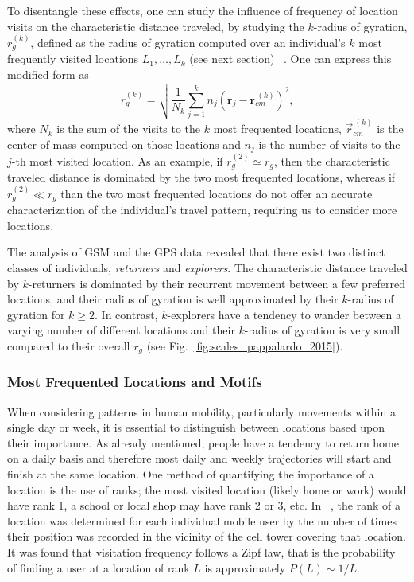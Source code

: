 To disentangle these effects, one can study the influence of frequency of location visits on the characteristic distance traveled, by studying the $k$-radius of gyration, $r_g^{(k)}$, defined as the radius of gyration computed over an individual's $k$ most frequently visited locations $L_1, \dots, L_k$ (see next section) ~\cite{pappalardo_2015_returners}. One can express this modified form as
\begin{equation}
\label{eq:k_radius}
r_g^{(k)} = \sqrt{{\frac{1}{N_k}} \sum_{j = 1}^{k} n_j (\mathbf{r}_j - \mathbf{r}_{cm}^{\ (k)})^2},
\end{equation}
where $N_k$ is the sum of the visits to the $k$ most frequented locations, $\vec{r}_{cm}^{\ (k)}$ is the center of mass computed on those  locations and $n_j$ is the number of visits to the $j$-th most visited location. As an example, if $r_g^{(2)} \simeq r_g$, then the characteristic traveled distance is dominated by the two most frequented locations, whereas if  $r_g^{(2)} \ll r_g$ than the two most frequented locations do not offer an accurate characterization of the individual's travel pattern, requiring us to consider more locations.

The analysis of GSM and the GPS data revealed that there exist two distinct classes of individuals, {\em returners} and {\em explorers}. 
The characteristic distance traveled by $k$-returners is dominated by their recurrent movement between a few preferred locations, and their radius of gyration is well approximated by their $k$-radius of gyration for $k \geq 2$.
In contrast, $k$-explorers have a tendency to wander between a varying number of different locations and their $k$-radius of gyration is very small compared to their overall $r_g$ (see Fig.~\ref{fig:scales_pappalardo_2015}). 




\subsubsection{Most Frequented Locations and Motifs}
When considering patterns in human mobility, particularly movements within a single day or week, it is essential to distinguish between locations based upon their importance. As already mentioned, people have a tendency to return home on a daily basis and therefore most daily and weekly trajectories will start and finish at the same location.
One method of quantifying the importance of a location is the use of ranks; the most visited location (likely home or work) would have rank 1, a school or local shop may have rank 2 or 3, etc. 
In ~\cite{gonzalez_2008_understanding}, the rank of a location was determined for each individual mobile user by the number of times their position was recorded in the vicinity of the cell tower covering that location. It was found that visitation frequency follows a Zipf law, that is the probability of finding a user at a location of rank $L$ is approximately $P(L) \sim 1/L$. 

